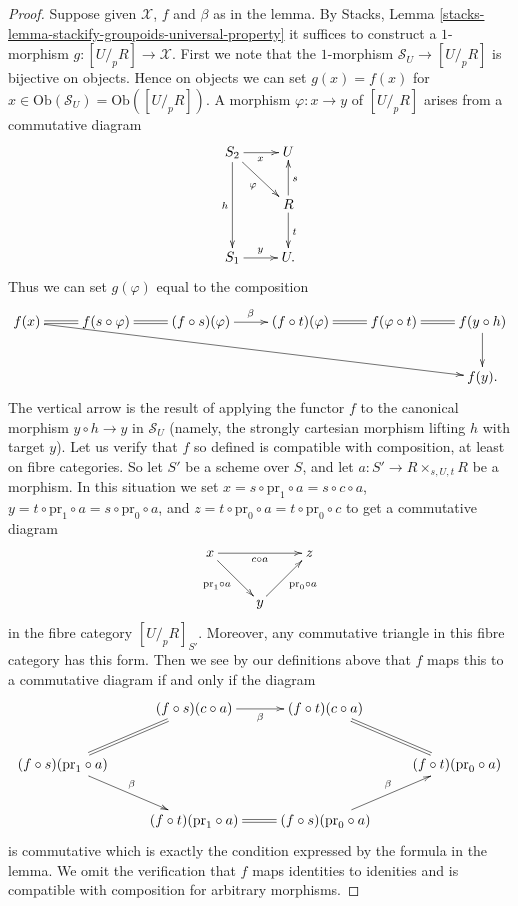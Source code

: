 \begin{proof}
Suppose given $\mathcal{X}$, $f$ and $\beta$ as in the lemma. By
Stacks, Lemma \ref{stacks-lemma-stackify-groupoids-universal-property}
it suffices to construct a $1$-morphism $g : [U/_{\!p}R] \to \mathcal{X}$.
First we note that the $1$-morphism
$\mathcal{S}_U \to [U/_{\!p}R]$ is bijective on objects.
Hence on objects we can set $g(x) = f(x)$ for
$x \in \text{Ob}(\mathcal{S}_U) = \text{Ob}([U/_{\!p}R])$.
A morphism $\varphi : x \to y$ of $[U/_{\!p}R]$ arises from a
commutative diagram
$$
\xymatrix{
S_2 \ar[dd]_h \ar[r]_x \ar[dr]_\varphi & U \\
& R \ar[u]_s \ar[d]^t \\
S_1 \ar[r]^y & U.
}
$$
Thus we can set $g(\varphi)$ equal to the composition
$$
\xymatrix{
f(x) \ar@{=}[r] \ar[rrrrrd] &
f(s \circ \varphi) \ar@{=}[r] &
(f \circ s)(\varphi) \ar[r]^\beta &
(f \circ t)(\varphi) \ar@{=}[r] &
f(\varphi \circ t) \ar@{=}[r] &
f(y \circ h) \ar[d] \\
& & & & & f(y).
}
$$
The vertical arrow is the result of applying the functor $f$ to the
canonical morphism $y \circ h \to y$ in $\mathcal{S}_U$ (namely, the
strongly cartesian morphism lifting $h$ with target $y$).
Let us verify that $f$ so defined is compatible with composition, at least
on fibre categories. So let $S'$ be a scheme over $S$, and let
$a : S' \to R \times_{s, U, t} R$ be a morphism. In this situation
we set $x = s \circ \text{pr}_1 \circ a = s \circ c \circ a$,
$y = t \circ \text{pr}_1 \circ a = s \circ \text{pr}_0 \circ a$, and
$z = t \circ \text{pr}_0 \circ a = t \circ \text{pr}_0 \circ c$ to
get a commutative diagram
$$
\xymatrix{
x \ar[rr]_{c \circ a} \ar[rd]_{\text{pr}_1 \circ a} & & z \\
& y \ar[ru]_{\text{pr}_0 \circ a}
}
$$
in the fibre category $[U/_{\!p}R]_{S'}$. Moreover, any commutative
triangle in this fibre category has this form. Then we see by our definitions
above that $f$ maps this to a commutative diagram if and only if
the diagram
$$
\xymatrix{
& (f \circ s)(c \circ a) \ar[r]_-{\beta} &
(f \circ t)(c \circ a) \ar@{=}[rd] & \\
(f \circ s)(\text{pr}_1 \circ a) \ar[rd]^\beta \ar@{=}[ru] & & &
(f \circ t)(\text{pr}_0 \circ a) \\
& (f \circ t)(\text{pr}_1 \circ a) \ar@{=}[r] &
(f \circ s)(\text{pr}_0 \circ a) \ar[ru]^\beta
}
$$
is commutative which is exactly the condition expressed by the formula
in the lemma. We omit the
verification that $f$ maps identities to idenities and is compatible
with composition for arbitrary morphisms.
\end{proof}

